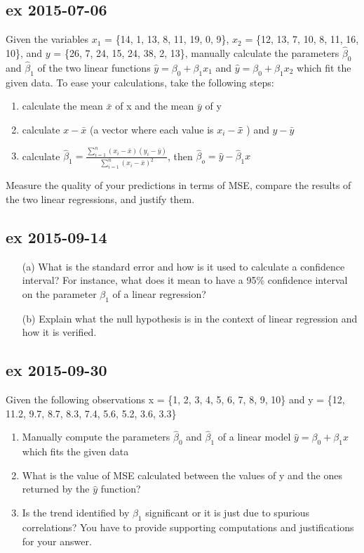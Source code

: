 \documentclass[a4paper,12pt,titlepage]{article} %
\begin{document}
\subsection{ex 2015-07-06}
Given the variables $ x_{1} $ = \{14, 1, 13, 8, 11, 19, 0, 9\}, $ x_{2} $ = \{12, 13, 7, 10, 8, 11, 16, 10\}, and $ y $ = \{26, 7, 24, 15, 24, 38, 2, 13\}, manually calculate the parameters $ \hat{\beta}_{0} $ and $ \hat{\beta}_{1} $ of the two linear functions $ \hat{y} = \beta_{0} + \beta_{1} x_{1} $ and $ \hat{y} = \beta_{0} + \beta_{1} x_{2} $ which fit the given data. To ease your calculations, take the following steps:
\begin{enumerate}
\item calculate the mean $ \bar{x} $ of x and the mean $ \bar{y} $ of y
\item calculate $ x - \bar{x} $ (a vector where each value is $ x_{i} - \bar{x} $̄ ) and $ y - \bar{y} $  
\item calculate $ \hat{\beta}_{1} = \frac{\sum_{i=1}^{n} (x_{i}-\bar{x}) (y_{i}-\bar{y})}{ \sum_{i=1}^{n} (x_{i}-\bar{x})^{2} } $, then $ \hat{\beta}_{o} = \hat{y} - \hat{\beta}_{1} x $
\end{enumerate}
Measure the quality of your predictions in terms of MSE, compare the results of the two
linear regressions, and justify them.

\subsection{ex 2015-09-14}
\begin{itemize}
\item[(a)] What is the standard error and how is it used to calculate a confidence interval? For instance, what does it mean to have a 95\% confidence interval on the parameter $ \beta_{1} $ of a linear regression?
\item[(b)] Explain what the null hypothesis is in the context of linear regression and how it is
verified.
\end{itemize}

\subsection{ex 2015-09-30}
Given the following observations x = \{1, 2, 3, 4, 5, 6, 7, 8, 9, 10\} and y = \{12, 11.2, 9.7, 8.7, 8.3, 7.4, 5.6, 5.2, 3.6, 3.3\}
\begin{enumerate}
\item Manually compute the parameters $ \hat{\beta}_{0} $ and $ \hat{\beta}_{1} $ of a linear model $ \hat{y} = \beta_{0} + \beta_{1} x $ which fits the given data
\item What is the value of MSE calculated between the values of y and the ones returned by the $ \hat{y} $ function?
\item Is the trend identified by $ \hat{\beta}_{1} $ significant or it is just due to spurious correlations? You have to provide supporting computations and justifications for your answer. 
\end{enumerate}
\end{document}
